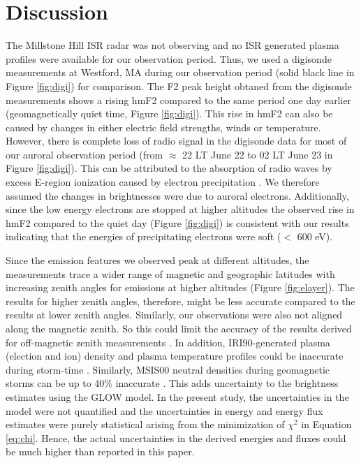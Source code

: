 

\section{Discussion}
The Millstone Hill ISR radar was not observing and no ISR generated plasma profiles were available for our observation period. Thus, we used a digisonde \citep{giro} measurements at Westford, MA during our observation period (solid black line in Figure \ref{fig:digi}) for comparison. The F2 peak height obtaned from the digisonde measurements shows a rising hmF2 compared to the same period one day earlier (geomagnetically quiet time, Figure \ref{fig:digi}). This rise in hmF2 can also be caused by changes in either electric field strengths, winds or temperature. However, there is complete loss of radio signal in the digisonde data for most of our auroral observation period (from $\approx$ 22 LT June 22 to 02 LT June 23 in Figure \ref{fig:digi}). This can be attributed to the absorption of radio waves by excess E-region ionization caused by electron precipitation \citep{pallamraju_2011}. We therefore assumed the changes in brightnesses were due to auroral electrons. Additionally, since the low energy electrons are stopped at higher altitudes \citep{rees_1963} the observed rise in
hmF2 compared to the quiet day (Figure \ref{fig:digi}) is consistent with our results indicating that the energies of precipitating electrons were soft ($<$ 600 eV).

Since the emission features we observed peak at different altitudes, the measurements trace a wider range of magnetic and geographic latitudes with increasing zenith angles for emissions at higher altitudes (Figure \ref{fig:elayer}). The results for higher zenith angles, therefore, might be less accurate compared to the results at lower zenith angles. Similarly, our observations were also not aligned along the magnetic zenith. So this could limit the accuracy of the results derived for off-magnetic zenith measurements \citep{grubbs_multi_spec}. In addition, IRI90-generated plasma (election and ion) density and plasma temperature profiles could be inaccurate during storm-time \citep{iri_storm}. Similarly, MSIS00 neutral densities during geomagnetic storms can be up to 40\% inaccurate \citep{fang_variations_2012}. This adds uncertainty to the brightness estimates using the GLOW model. In the present study, the uncertainties in the model were not quantified and the uncertainties in energy and energy flux estimates were purely statistical arising from the minimization of $\chi^2$ in Equation \ref{eq:chi}. Hence, the actual uncertainties in the derived energies and fluxes could be much higher than reported in this paper.    


